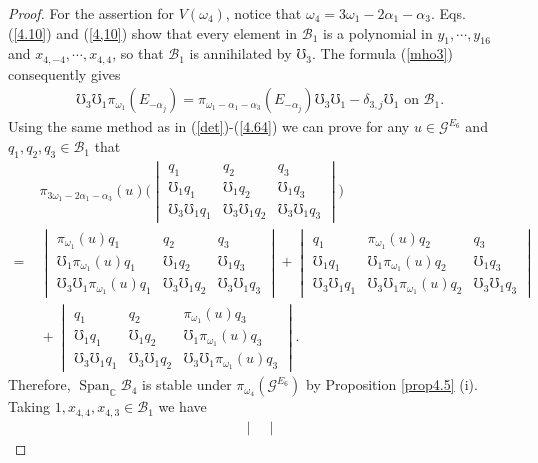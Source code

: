 \documentclass[12pt]{article}
\numberwithin{equation}{section}
\theoremstyle{definition}
\theoremstyle{remark}
\begin{document}
\begin{proof}
 	For the assertion for $V(\omega_4)$, notice that $\omega_4=3\omega_1-2\alpha_1-\alpha_3$. Eqs. (\ref{4.10}) and (\ref{4,10}) show that every element in $\mathcal{B}_1$ is a polynomial in $y_1,\cdots,y_{16}$ and $x_{4,-4},\cdots,x_{4,4}$, so that $\mathcal{B}_1$ is annihilated by $\mho_3$. The formula (\ref{mho3}) consequently gives
 	\begin{eqnarray}
 		\mho_3\mho_1\pi_{\omega_1}(E_{-\alpha_j})=\pi_{\omega_1-\alpha_1-\alpha_3}(E_{-\alpha_j})\mho_3\mho_1-\delta_{3,j}\mho_1 \text{ on }\mathcal{B}_1.
 	\end{eqnarray}
 	Using the same method as in (\ref{det})-(\ref{4.64}) we can prove for any $u\in\mathscr{G}^{E_6}$ and $q_1,q_2,q_3\in\mathcal{B}_1$ that
 	\begin{align}
 		&\;\pi_{3\omega_1-2\alpha_1-\alpha_3}(u)\big(\begin{vmatrix}
 			q_1&q_2&q_3\\ \mho_1q_1&\mho_1q_2&\mho_1q_3 \\ \mho_3\mho_1q_1&\mho_3\mho_1q_2&\mho_3\mho_1q_3
 		\end{vmatrix}\big)\nonumber\\
 		=&\;\begin{vmatrix}
 			\pi_{\omega_1}(u)q_1&q_2&q_3\\ \mho_1\pi_{\omega_1}(u)q_1&\mho_1q_2&\mho_1q_3 \\ \mho_3\mho_1\pi_{\omega_1}(u)q_1&\mho_3\mho_1q_2&\mho_3\mho_1q_3
 		\end{vmatrix}+\begin{vmatrix}
 			q_1&\pi_{\omega_1}(u)q_2&q_3\\ \mho_1q_1&\mho_1\pi_{\omega_1}(u)q_2&\mho_1q_3 \\ \mho_3\mho_1q_1&\mho_3\mho_1\pi_{\omega_1}(u)q_2&\mho_3\mho_1q_3
 		\end{vmatrix}\nonumber\\
 		&\;+\begin{vmatrix}
 			q_1&q_2&\pi_{\omega_1}(u)q_3\\ \mho_1q_1&\mho_1q_2&\mho_1\pi_{\omega_1}(u)q_3 \\ \mho_3\mho_1q_1&\mho_3\mho_1q_2&\mho_3\mho_1\pi_{\omega_1}(u)q_3
 		\end{vmatrix}.
 	\end{align}
 	Therefore, $\operatorname{Span}_{\mathbb{C}}\mathcal{B}_4$ is stable under $\pi_{\omega_4}(\mathscr{G}^{E_6})$ by Proposition \ref{prop4.5} (i). Taking $1,x_{4,4},x_{4,3}\in\mathcal{B}_1$ we have
 	\begin{eqnarray}
 		\begin{vmatrix}

\end{vmatrix}
\end{eqnarray}
\end{proof}
\end{document}
